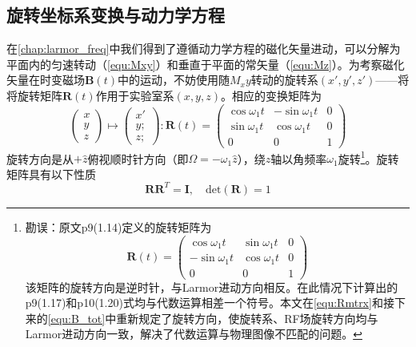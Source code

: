 \documentclass[12pt]{article}
\begin{document}
\subsection{旋转坐标系变换与动力学方程}
在\autoref{chap:larmor_freq}中我们得到了遵循动力学方程的磁化矢量进动，可以分解为平面内的匀速转动（\autoref{equ:Mxy}）和垂直于平面的常矢量（\autoref{equ:Mz}）。为考察磁化矢量在时变磁场$\bm{B}(t)$中的运动，不妨使用随$M_xy$转动的旋转系$(x',y',z')$——将将旋转矩阵$\mathbf{R}(t)$作用于实验室系$(x,y,z)$。相应的变换矩阵为
\begin{equation}
    \begin{pmatrix} x \\ y \\ z \end{pmatrix}\mapsto\begin{pmatrix} x' \\ y; \\ z; \end{pmatrix}:\mathbf{R}(t)=\begin{pmatrix}
    \cos\omega_1t & -\sin\omega_1t & 0 \\
    \sin\omega_1t & \cos\omega_1t & 0 \\
    0 & 0 & 1
    \end{pmatrix}
    \label{equ:Rmtrx}
\end{equation}
旋转方向是从$+\hat{z}$俯视顺时针方向（即$\Omega=-\omega_1\hat{z}$），绕$z$轴以角频率$\omega_1$旋转\footnote{勘误：原文p9(1.14)定义的旋转矩阵为
\begin{equation}
    \mathbf{R}(t)=\begin{pmatrix}\cos\omega_1t & \sin\omega_1t & 0 \\ -\sin\omega_1t & \cos\omega_1t & 0 \\ 0 & 0 & 1 \end{pmatrix}
\end{equation}
该矩阵的旋转方向是逆时针，与Larmor进动方向相反。在此情况下计算出的p9(1.17)和p10(1.20)式均与代数运算相差一个符号。本文在\autoref{equ:Rmtrx}和接下来的\autoref{equ:B_tot}中重新规定了旋转方向，使旋转系、RF场旋转方向均与Larmor进动方向一致，解决了代数运算与物理图像不匹配的问题。\label{footnote:dir}}。旋转矩阵具有以下性质
\begin{equation}
    \mathbf{R}\mathbf{R}^T=\bm{I},\quad\mathrm{det}(\mathbf{R})=1
\end{equation}
\end{document}
